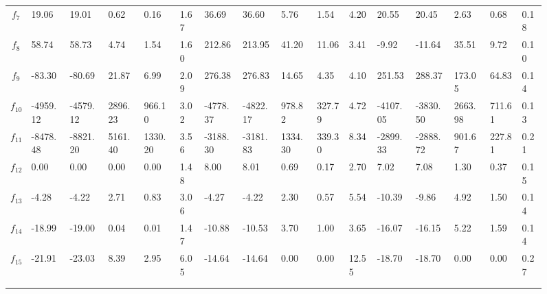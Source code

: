 \documentclass[paper=a4, fontsize=11pt]{scrartcl}
\numberwithin{equation}{section}
\numberwithin{figure}{section}
\numberwithin{table}{section}
\begin{document}
\begin{figure}
{{\begin{tabular}{c|lllll|lllll|lllll}
$f_7$    & 19.06    & 19.01     & 0.62	    & 0.16      & 1.67      & 36.69         & 36.60         & 5.76          & 1.54          & 4.20      & 20.55     & 20.45         & 2.63          & 0.68          & 0.18     \\
$f_8$    & 58.74    & 58.73     & 4.74	    & 1.54      & 1.60      & 212.86        & 213.95        & 41.20         & 11.06         & 3.41      & -9.92     & -11.64        & 35.51         & 9.72          & 0.10     \\
$f_9$    & -83.30   & -80.69    & 21.87	    & 6.99      & 2.09      & 276.38        & 276.83        & 14.65         & 4.35          & 4.10      & 251.53    & 288.37        & 173.05        & 64.83         & 0.14     \\
$f_{10}$ & -4959.12 & -4579.12  & 2896.23	& 966.10    & 3.02      & -4778.37      & -4822.17      & 978.82        & 327.79        & 4.72      & -4107.05  & -3830.50      & 2663.98       & 711.61        & 0.13     \\
$f_{11}$ & -8478.48 & -8821.20  & 5161.40	& 1330.20   & 3.56      & -3188.30      & -3181.83      & 1334.30       & 339.30        & 8.34      & -2899.33  & -2888.72      & 901.67        & 227.81        & 0.21     \\
$f_{12}$ & 0.00     & 0.00      & 0.00	    & 0.00      & 1.48      & 8.00          & 8.01          & 0.69          & 0.17          & 2.70      & 7.02      & 7.08          & 1.30          & 0.37          & 0.15     \\
$f_{13}$ & -4.28    & -4.22     & 2.71	    & 0.83      & 3.06      & -4.27         & -4.22         & 2.30          & 0.57          & 5.54      & -10.39    & -9.86         & 4.92          & 1.50          & 0.14     \\
$f_{14}$ & -18.99   & -19.00    & 0.04	    & 0.01      & 1.47      & -10.88        & -10.53        & 3.70          & 1.00          & 3.65      & -16.07    & -16.15        & 5.22          & 1.59          & 0.14     \\
$f_{15}$ & -21.91   & -23.03    & 8.39      & 2.95      & 6.05      & -14.64        & -14.64        & 0.00          & 0.00          & 12.55     & -18.70    & -18.70        & 0.00          & 0.00          & 0.27     \\ \noalign{\smallskip}\hline\noalign{\smallskip}
     & & & & & & & & & & & & & & &       \\
\noalign{\smallskip}\hline\noalign{\smallskip} \multicolumn{16}{l}{\tiny $^1$ ThinkPad, 3.4GHz Intel Core i7 (3rd gen), 16 GB RAM}

\end{tabular}
}}

\end{figure}
\end{document}

